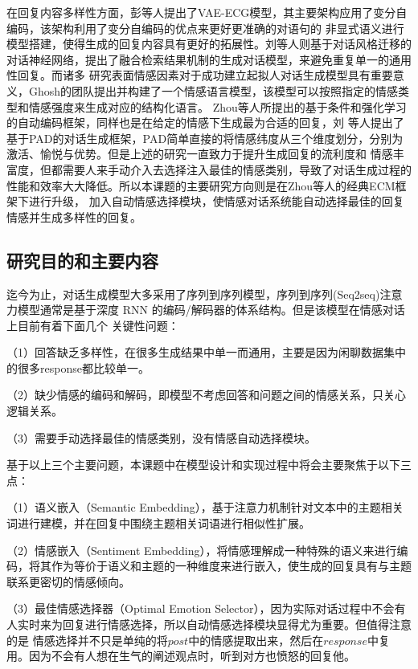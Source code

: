 \documentclass[supercite]{HustGraduPaper}
\theoremstyle{definition}
\begin{document}
在回复内容多样性方面，彭\cite{彭叶红2019基于主题模型与变分自编码的情感对话生成技术研究}等人提出了VAE-ECG模型，其主要架构应用了变分自编码，该架构利用了变分自编码的优点来更好更准确的对语句的
非显式语义进行模型搭建，使得生成的回复内容具有更好的拓展性。刘\cite{对话风格迁移}等人则基于对话风格迁移的对话神经网络，提出了融合检索结果机制的生成对话模型，来避免重复单一的通用性回复。而诸多
研究表面情感因素对于成功建立起拟人对话生成模型具有重要意义，Ghosh\cite{ghosh2017affect}的团队提出并构建了一个情感语言模型，该模型可以按照指定的情感类型和情感强度来生成对应的结构化语言。
Zhou等人\cite{DBLP:journals/corr/ZhouHZZL17}所提出的基于条件和强化学习的自动编码框架，同样也是在给定的情感下生成最为合适的回复，刘\cite{刘宁2019人机交互的情感拟人化策略研究}
等人提出了基于PAD\cite{刘磊2019基于}的对话生成框架，PAD简单直接的将情感纬度从三个维度划分，分别为激活、愉悦与优势。但是上述的研究一直致力于提升生成回复的流利度和
情感丰富度，但都需要人来手动介入去选择注入最佳的情感类别，导致了对话生成过程的性能和效率大大降低。所以本课题的主要研究方向则是在Zhou\cite{DBLP:journals/corr/ZhouHZZL17}等人的经典ECM框架下进行升级，
加入自动情感选择模块，使情感对话系统能自动选择最佳的回复情感\cite{oh2017chatbot}并生成多样性的回复。

\subsection{研究目的和主要内容}
迄今为止，对话生成模型大多采用了序列到序列模型，序列到序列(Seq2seq)注意力模型通常是基于深度 RNN 的编码/解码器的体系结构。但是该模型在情感对话上目前有着下面几个
关键性问题：

（1）回答缺乏多样性，在很多生成结果中单一而通用，主要是因为闲聊数据集中的很多response都比较单一。

（2）缺少情感的编码和解码，即模型不考虑回答和问题之间的情感关系，只关心逻辑关系。

（3）需要手动选择最佳的情感类别，没有情感自动选择模块。

基于以上三个主要问题，本课题中在模型设计和实现过程中将会主要聚焦于以下三点：

（1）语义嵌入（Semantic Embedding），基于注意力机制\cite{杨丰瑞2020基于注意力机制的主题扩展情感对话生成}针对文本中的主题相关词进行建模，并在回复中围绕主题相关词语进行相似性扩展。

（2）情感嵌入（Sentiment Embedding），将情感理解成一种特殊的语义来进行编码，将其作为等价于语义和主题的一种维度来进行嵌入，使生成的回复具有与主题联系更密切的情感倾向。

（3）最佳情感选择器\cite{wei2019emotion}（Optimal Emotion Selector），因为实际对话过程中不会有人实时来为回复进行情感选择，所以自动情感选择模块显得尤为重要。但值得注意的是
情感选择并不只是单纯的将$post$中的情感提取出来，然后在$response$中复用。因为不会有人想在生气的阐述观点时，听到对方也愤怒的回复他。
\end{document}
